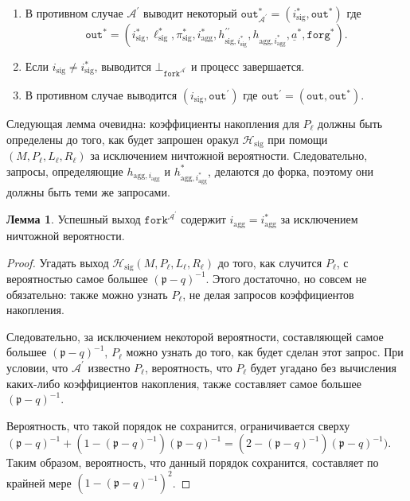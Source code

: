 \documentclass{mrl}
\theoremstyle{definition}
\numberwithin{theorem}{subsection}
\newtheorem{lemma}[theorem]{Лемма}
\newcommand{\adversary}{\mathcal{A}}
\newcommand{\p}{\mathfrak{p}}
\begin{document}
\begin{description}
\begin{enumerate}
\item В противном случае $\adversary^\prime$ выводит некоторый $\texttt{out}_{\adversary^\prime}^* = (i_{\text{sig}}^*, \texttt{out}^*)$ где \[\texttt{out}^* = (i_{\text{sig}}^*, \ell_{\text{sig}}^*, \pi_{\text{sig}}^*, i_{\text{agg}}^*, h_{\text{sig}, i_{\text{sig}}^*}^{\prime \prime}, h_{\text{agg}, i_{\text{agg}}^*}, \underline{a}^*, \texttt{forg}^*).\]

\item Если $i_{\text{sig}} \neq i_{\text{sig}}^*$, выводится $\bot_{\texttt{fork}^{\adversary^\prime}}$ и процесс завершается.

\item В противном случае выводится $(i_{\text{sig}}, \texttt{out}^{\prime})$ где $\texttt{out}^\prime = (\texttt{out}, \texttt{out}^*)$.
\end{enumerate}
\end{description}


Следующая лемма очевидна: коэффициенты накопления для $P_\ell$ должны быть определены до того, как будет запрошен оракул $\mathcal{H}_{\text{sig}}$ при помощи $(M, P_\ell, L_\ell, R_\ell)$ за исключением ничтожной вероятности. Следовательно, запросы, определяющие $h_{\text{agg},i_{\text{agg}}}$ и $h_{\text{agg},i_{\text{agg}}^*}^*$, делаются до форка, поэтому они должны быть теми же запросами.

\begin{lemma}
Успешный выход $\texttt{fork}^{\adversary^\prime}$ содержит $i_{\text{agg}} = i^*_{\text{agg}}$ за исключением ничтожной вероятности.
\end{lemma}

\begin{proof}
Угадать выход $\mathcal{H}_{\text{sig}}(M, P_\ell, L_\ell, R_\ell)$ до того, как случится $P_\ell$, с вероятностью самое большее $(\p - q)^{-1}$. Этого достаточно, но совсем не обязательно: также можно узнать $P_\ell$, не делая запросов коэффициентов накопления.

Следовательно, за исключением некоторой вероятности, составляющей самое большее $(\p - q)^{-1}$, $P_\ell$ можно узнать до того, как будет сделан этот запрос. При условии, что $\adversary^\prime$ известно $P_\ell$, вероятность, что $P_\ell$ будет угадано без вычисления каких-либо коэффициентов накопления, также составляет самое большее $(\p -q )^{-1}$.

Вероятность, что такой порядок не сохранится, ограничивается сверху $(\p - q)^{-1} + (1 - (\p - q)^{-1})(\p - q)^{-1} = (2 - (\p - q)^{-1})(\p - q)^{-1})$. Таким образом, вероятность, что данный порядок сохранится, составляет по крайней мере $(1-(\p-q)^{-1})^2$.
\end{proof}
\end{document}
